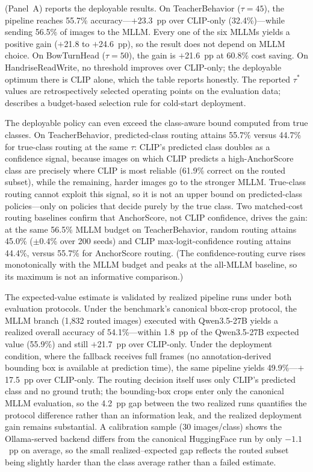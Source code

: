 \documentclass[11pt,a4paper]{article}
\begin{document}
 (Panel~A) reports the deployable results. On TeacherBehavior ($\tau=45$), the pipeline reaches 55.7\% accuracy---$+$23.3~pp over CLIP-only (32.4\%)---while sending 56.5\% of images to the MLLM. Every one of the six MLLMs yields a positive gain ($+$21.8 to $+$24.6~pp), so the result does not depend on MLLM choice. On BowTurnHead ($\tau=50$), the gain is $+$21.6~pp at 60.8\% cost saving. On HandriseReadWrite, no threshold improves over CLIP-only; the deployable optimum there is CLIP alone, which the table reports honestly. The reported $\tau^*$ values are retrospectively selected operating points on the evaluation data;  describes a budget-based selection rule for cold-start deployment.

The deployable policy can even exceed the class-aware bound computed from true classes. On TeacherBehavior, predicted-class routing attains 55.7\% versus 44.7\% for true-class routing at the same $\tau$: CLIP's predicted class doubles as a confidence signal, because images on which CLIP predicts a high-AnchorScore class are precisely where CLIP is most reliable (61.9\% correct on the routed subset), while the remaining, harder images go to the stronger MLLM. True-class routing cannot exploit this signal, so it is not an upper bound on predicted-class policies---only on policies that decide purely by the true class. Two matched-cost routing baselines confirm that AnchorScore, not CLIP confidence, drives the gain: at the same 56.5\% MLLM budget on TeacherBehavior, random routing attains 45.0\% ($\pm$0.4\% over 200 seeds) and CLIP max-logit-confidence routing attains 44.4\%, versus 55.7\% for AnchorScore routing. (The confidence-routing curve rises monotonically with the MLLM budget and peaks at the all-MLLM baseline, so its maximum is not an informative comparison.)

The expected-value estimate is validated by realized pipeline runs under both evaluation protocols. Under the benchmark's canonical bbox-crop protocol, the MLLM branch (1{,}832 routed images) executed with Qwen3.5-27B yields a realized overall accuracy of 54.1\%---within 1.8~pp of the Qwen3.5-27B expected value (55.9\%) and still $+$21.7~pp over CLIP-only. Under the deployment condition, where the fallback receives full frames (no annotation-derived bounding box is available at prediction time), the same pipeline yields 49.9\%---$+$17.5~pp over CLIP-only. The routing decision itself uses only CLIP's predicted class and no ground truth; the bounding-box crops enter only the canonical MLLM evaluation, so the 4.2~pp gap between the two realized runs quantifies the protocol difference rather than an information leak, and the realized deployment gain remains substantial. A calibration sample (30 images/class) shows the Ollama-served backend differs from the canonical HuggingFace run by only $-1.1$~pp on average, so the small realized--expected gap reflects the routed subset being slightly harder than the class average rather than a failed estimate.
\end{document}
